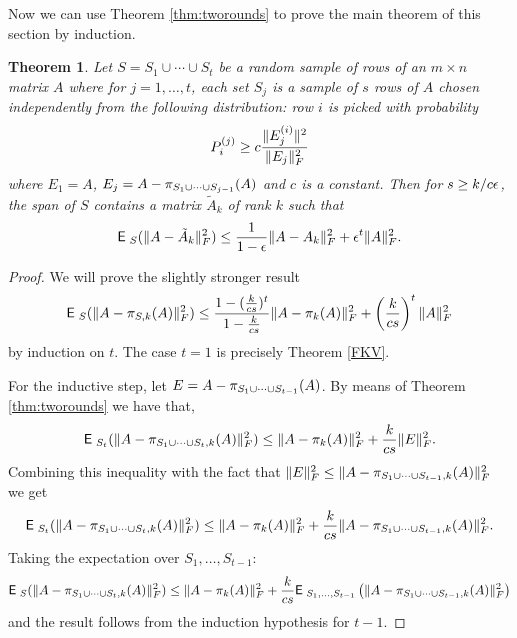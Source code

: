 \documentclass{book}
\newtheorem{theorem}{Theorem}[chapter]
\numberwithin{exercise}{chapter}
\begin{document}
Now we can use Theorem \ref{thm:tworounds} to prove the main theorem of this section by induction.
\begin{theorem}\label{thm:adaptive}
Let $S = S_1 \cup \dotsb \cup S_t$ be a random sample of rows of
an $m \times n$ matrix $A$ where for $j=1,\ldots,t$, each set
$S_j$ is a sample of $s$ rows of $A$ chosen independently from the
following distribution: row $i$ is picked with probability
\[
P_i^{(j)} \geq c \frac{\|E_j^{(i)}\|^2}{\|E_j\|_{F}^2}
\]
where $E_1 =A$, $E_j = A - \pi_{S_1 \cup \dotsb \cup
S_{j-1}}(A)$ and $c$ is a constant. Then for $s \ge k/c\epsilon$, the
span of $S$ contains a matrix $\tilde{A}_k$ of rank $k$ such that
\[
\hbox{{\sf E}\;}_{S} (\|A-\tilde{A}_k\|_{F}^2) \leq \frac{1}{1-\epsilon}
\|A-A_k\|_{F}^2 + \epsilon^t\|A\|_{F}^2.
\]
\end{theorem}
\begin{proof}
We will prove the slightly stronger result
\[
\hbox{{\sf E}\;}_{S} (\|A-\pi_{S,k}(A)\|_{F}^2) \leq
\frac{1-(\frac{k}{cs})^t}{1-\frac{k}{cs}} \|A-\pi_k(A)\|_{F}^2 +
\left(\frac{k}{cs}\right)^t \|A\|_{F}^2
\]
by induction on $t$. The case $t=1$ is precisely Theorem
\ref{FKV}.

For the inductive step, let $E = A - \pi_{S_1 \cup \dotsb \cup
S_{t-1}}(A)$. By means of Theorem \ref{thm:tworounds} we have
that,
\[
\hbox{{\sf E}\;}_{S_t} (\|A-\pi_{S_1 \cup \dotsb \cup S_t,k}(A)\|_{F}^2) \leq
\|A-\pi_k(A)\|_{F}^2 + \frac{k}{cs} \|E\|_{F}^2.
\]
Combining this inequality with the fact that $\|E\|_{F}^2 \leq
\|A-\pi_{S_1 \cup \dotsb \cup S_{t-1},k}(A)\|_{F}^2$ we get
\[
\hbox{{\sf E}\;}_{S_t} (\|A-\pi_{S_1 \cup \dotsb \cup S_t,k}(A)\|_{F}^2) \leq
\|A-\pi_k(A)\|_{F}^2 + \frac{k}{cs} \|A-\pi_{S_1 \cup
\dotsb \cup S_{t-1},k}(A)\|_{F}^2.
\]
Taking the expectation over $S_1, \dotsc, S_{t-1}$:
\[
\hbox{{\sf E}\;}_{S} (\|A-\pi_{S_1 \cup \dotsb \cup S_t,k}(A)\|_{F}^2) \leq
\|A-\pi_k(A)\|_{F}^2 + \frac{k}{cs} \hbox{{\sf E}\;} _{S_1, \dotsc,
S_{t-1}}\left(\|A-\pi_{S_1 \cup \dots \cup
S_{t-1},k}(A)\|_{F}^2\right)
\]
and the result follows from the induction hypothesis for $t-1$.
\end{proof}
\end{document}
